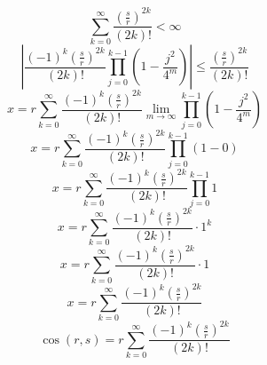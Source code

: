 \documentclass[a4paper,12pt]{report}
\begin{document}
\begin{equation}
\sum \limits_{k=0}^{\infty} \frac{\left(\frac{s}{r}\right)^{2k}}{(2k)!} < \infty
\end{equation}
\begin{equation}
\left|\frac{(-1)^k \left(\frac{s}{r}\right)^{2k}}{(2k)!} \prod \limits_{j=0}^{k-1} \left(1 - \frac{j^2}{4^m}\right)\right| \leq \frac{\left(\frac{s}{r}\right)^{2k}}{(2k)!}
\end{equation}
\begin{equation}
x = r \sum \limits_{k=0}^{\infty} \frac{(-1)^k \left(\frac{s}{r}\right)^{2k}}{(2k)!} \lim \limits_{m \to \infty} \prod \limits_{j=0}^{k-1} \left(1 - \frac{j^2}{4^m}\right)
\end{equation}
\begin{equation}
x = r \sum \limits_{k=0}^{\infty} \frac{(-1)^k \left(\frac{s}{r}\right)^{2k}}{(2k)!} \prod \limits_{j=0}^{k-1} \left(1 - 0\right)
\end{equation}
\begin{equation}
x = r \sum \limits_{k=0}^{\infty} \frac{(-1)^k \left(\frac{s}{r}\right)^{2k}}{(2k)!} \prod \limits_{j=0}^{k-1} 1
\end{equation}
\begin{equation}
x = r \sum \limits_{k=0}^{\infty} \frac{(-1)^k \left(\frac{s}{r}\right)^{2k}}{(2k)!} \cdot 1^k
\end{equation}
\begin{equation}
x = r \sum \limits_{k=0}^{\infty} \frac{(-1)^k \left(\frac{s}{r}\right)^{2k}}{(2k)!} \cdot 1
\end{equation}
\begin{equation}
x = r \sum \limits_{k=0}^{\infty} \frac{(-1)^k \left(\frac{s}{r}\right)^{2k}}{(2k)!}
\end{equation}
\begin{equation}
\cos(r,s) = r \sum \limits_{k=0}^{\infty} \frac{(-1)^k \left(\frac{s}{r}\right)^{2k}}{(2k)!}
\end{equation}
\end{document}
